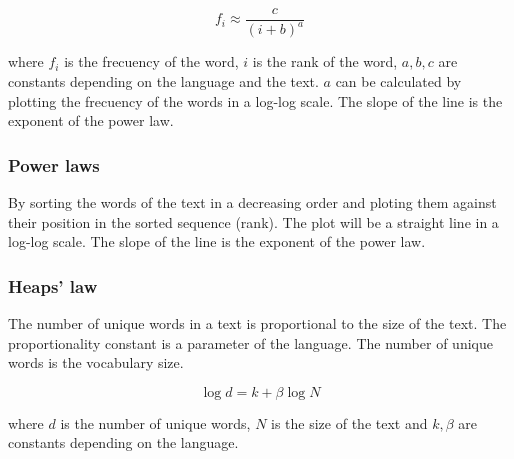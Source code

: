 \documentclass{article}
\begin{document}
\begin{equation}
    f_i \approx \frac{c}{(i+b)^a}
\end{equation}

where $f_i$ is the frecuency of the word, $i$ is the rank of the word, $a, b, c$ are constants depending on the language and the text. $a$ can be calculated by plotting the frecuency of the words in a log-log scale. The slope of the line is the exponent of the power law.

\subsubsection{Power laws}
By sorting the words of the text in a decreasing order and ploting them against their position in the sorted sequence (rank). The plot will be a straight line in a log-log scale. The slope of the line is the exponent of the power law.

\subsubsection{Heaps' law}

The number of unique words in a text is proportional to the size of the text. The proportionality constant is a parameter of the language. The number of unique words is the vocabulary size.

\begin{equation}
    \log{d} = k + \beta \log{N}
\end{equation}

where $d$ is the number of unique words, $N$ is the size of the text and $k, \beta$ are constants depending on the language.
\end{document}
